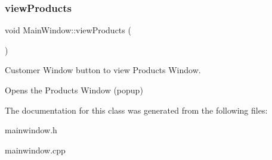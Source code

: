 \subsubsection{\texorpdfstring{view\+Products}{viewProducts}}
{\footnotesize\ttfamily void Main\+Window\+::view\+Products (\begin{DoxyParamCaption}{ }\end{DoxyParamCaption})\hspace{0.3cm}{\ttfamily [slot]}}



Customer Window button to view Products Window. 

Opens the Products Window (popup) 

The documentation for this class was generated from the following files\+:\begin{DoxyCompactItemize}
\item 
mainwindow.\+h\item 
mainwindow.\+cpp\end{DoxyCompactItemize}
